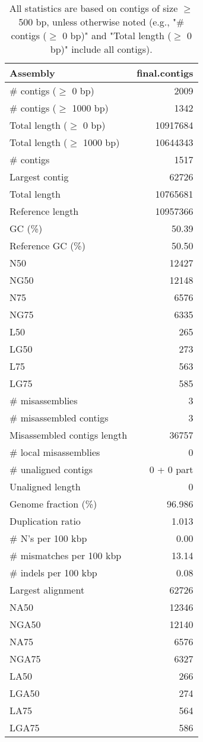 \documentclass[12pt,a4paper]{article}
\begin{document}
\begin{table}[ht]
\begin{center}
\caption{All statistics are based on contigs of size $\geq$ 500 bp, unless otherwise noted (e.g., "\# contigs ($\geq$ 0 bp)" and "Total length ($\geq$ 0 bp)" include all contigs).}
\begin{tabular}{|l*{1}{|r}|}
\hline
Assembly & final.contigs \\ \hline
\# contigs ($\geq$ 0 bp) & 2009 \\ \hline
\# contigs ($\geq$ 1000 bp) & 1342 \\ \hline
Total length ($\geq$ 0 bp) & 10917684 \\ \hline
Total length ($\geq$ 1000 bp) & 10644343 \\ \hline
\# contigs & 1517 \\ \hline
Largest contig & 62726 \\ \hline
Total length & 10765681 \\ \hline
Reference length & 10957366 \\ \hline
GC (\%) & 50.39 \\ \hline
Reference GC (\%) & 50.50 \\ \hline
N50 & 12427 \\ \hline
NG50 & 12148 \\ \hline
N75 & 6576 \\ \hline
NG75 & 6335 \\ \hline
L50 & 265 \\ \hline
LG50 & 273 \\ \hline
L75 & 563 \\ \hline
LG75 & 585 \\ \hline
\# misassemblies & 3 \\ \hline
\# misassembled contigs & 3 \\ \hline
Misassembled contigs length & 36757 \\ \hline
\# local misassemblies & 0 \\ \hline
\# unaligned contigs & 0 + 0 part \\ \hline
Unaligned length & 0 \\ \hline
Genome fraction (\%) & 96.986 \\ \hline
Duplication ratio & 1.013 \\ \hline
\# N's per 100 kbp & 0.00 \\ \hline
\# mismatches per 100 kbp & 13.14 \\ \hline
\# indels per 100 kbp & 0.08 \\ \hline
Largest alignment & 62726 \\ \hline
NA50 & 12346 \\ \hline
NGA50 & 12140 \\ \hline
NA75 & 6576 \\ \hline
NGA75 & 6327 \\ \hline
LA50 & 266 \\ \hline
LGA50 & 274 \\ \hline
LA75 & 564 \\ \hline
LGA75 & 586 \\ \hline
\end{tabular}
\end{center}
\end{table}
\end{document}
